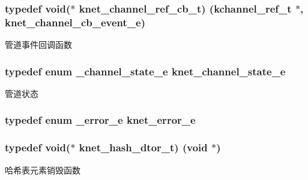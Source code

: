 \subsubsection[{knet\+\_\+channel\+\_\+ref\+\_\+cb\+\_\+t}]{\setlength{\rightskip}{0pt plus 5cm}typedef void($\ast$ knet\+\_\+channel\+\_\+ref\+\_\+cb\+\_\+t) ({\bf kchannel\+\_\+ref\+\_\+t} $\ast$, {\bf knet\+\_\+channel\+\_\+cb\+\_\+event\+\_\+e})}\label{a00054_a8a7d96123ef4565c6d08fe58a10476a9_a8a7d96123ef4565c6d08fe58a10476a9}
管道事件回调函数 \hypertarget{a00054_a74ff83eaafca5c7093accdc65c6b0646_a74ff83eaafca5c7093accdc65c6b0646}{}
\subsubsection[{knet\+\_\+channel\+\_\+state\+\_\+e}]{\setlength{\rightskip}{0pt plus 5cm}typedef enum {\bf \+\_\+channel\+\_\+state\+\_\+e}  {\bf knet\+\_\+channel\+\_\+state\+\_\+e}}\label{a00054_a74ff83eaafca5c7093accdc65c6b0646_a74ff83eaafca5c7093accdc65c6b0646}
管道状态 \hypertarget{a00054_abc9a047a9545c201adf70e4793ed0689_abc9a047a9545c201adf70e4793ed0689}{}
\subsubsection[{knet\+\_\+error\+\_\+e}]{\setlength{\rightskip}{0pt plus 5cm}typedef enum {\bf \+\_\+error\+\_\+e}  {\bf knet\+\_\+error\+\_\+e}}\label{a00054_abc9a047a9545c201adf70e4793ed0689_abc9a047a9545c201adf70e4793ed0689}
\hypertarget{a00054_af806592520383146be2f3aac316beb45_af806592520383146be2f3aac316beb45}{}
\subsubsection[{knet\+\_\+hash\+\_\+dtor\+\_\+t}]{\setlength{\rightskip}{0pt plus 5cm}typedef void($\ast$ knet\+\_\+hash\+\_\+dtor\+\_\+t) (void $\ast$)}\label{a00054_af806592520383146be2f3aac316beb45_af806592520383146be2f3aac316beb45}
哈希表元素销毁函数 \hypertarget{a00054_a8bb61ec2ff976625d0707a81c1ccc149_a8bb61ec2ff976625d0707a81c1ccc149}{}
